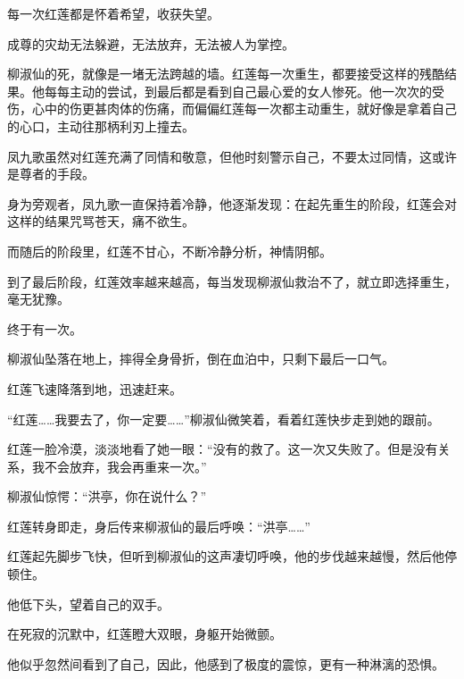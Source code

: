 \begin{this_body}
每一次红莲都是怀着希望，收获失望。

成尊的灾劫无法躲避，无法放弃，无法被人为掌控。

柳淑仙的死，就像是一堵无法跨越的墙。红莲每一次重生，都要接受这样的残酷结果。他每每主动的尝试，到最后都是看到自己最心爱的女人惨死。他一次次的受伤，心中的伤更甚肉体的伤痛，而偏偏红莲每一次都主动重生，就好像是拿着自己的心口，主动往那柄利刃上撞去。

凤九歌虽然对红莲充满了同情和敬意，但他时刻警示自己，不要太过同情，这或许是尊者的手段。

身为旁观者，凤九歌一直保持着冷静，他逐渐发现：在起先重生的阶段，红莲会对这样的结果咒骂苍天，痛不欲生。

而随后的阶段里，红莲不甘心，不断冷静分析，神情阴郁。

到了最后阶段，红莲效率越来越高，每当发现柳淑仙救治不了，就立即选择重生，毫无犹豫。

终于有一次。

柳淑仙坠落在地上，摔得全身骨折，倒在血泊中，只剩下最后一口气。

红莲飞速降落到地，迅速赶来。

“红莲……我要去了，你一定要……”柳淑仙微笑着，看着红莲快步走到她的跟前。

红莲一脸冷漠，淡淡地看了她一眼：“没有的救了。这一次又失败了。但是没有关系，我不会放弃，我会再重来一次。”

柳淑仙惊愕：“洪亭，你在说什么？”

红莲转身即走，身后传来柳淑仙的最后呼唤：“洪亭……”

红莲起先脚步飞快，但听到柳淑仙的这声凄切呼唤，他的步伐越来越慢，然后他停顿住。

他低下头，望着自己的双手。

在死寂的沉默中，红莲瞪大双眼，身躯开始微颤。

他似乎忽然间看到了自己，因此，他感到了极度的震惊，更有一种淋漓的恐惧。

\end{this_body}

